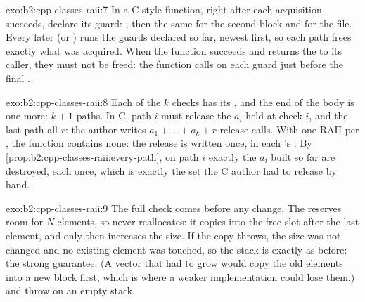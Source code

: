 \begin{solution}{exo:b2:cpp-classes-raii:7}
In a C-style function, right after each acquisition succeeds, declare its guard:
, then the same for the second
block and for the file. Every later  (or ) runs the guards declared so far, newest first, so
each path frees exactly what was acquired. When the function succeeds and returns the  to its caller, they
must not be freed: the function calls  on each guard just before the final .
\end{solution}

\begin{solution}{exo:b2:cpp-classes-raii:8}
Each of the $k$ checks has its , and the end of the body is one more: $k + 1$ paths. In C, path $i$ must
release the $a_i$  held at check $i$, and the last path all $r$: the author writes
$a_1 + \dots + a_k + r$ release calls. With one RAII  per , the function contains none: the release is
written once, in each 's . By \cref{prop:b2:cpp-classes-raii:every-path}, on path $i$ exactly the
$a_i$  built so far are destroyed, each once, which is exactly the set the C author had to release by hand.
\end{solution}

\begin{solution}{exo:b2:cpp-classes-raii:9}
The full check comes before any change. The  reserves room for $N$ elements, so  never
reallocates: it copies  into the free slot after the last element, and only then increases the size. If the
copy throws, the size was not changed and no existing element was touched, so the stack is exactly as before: the
strong guarantee. (A vector that had to grow would copy the old elements into a new block first, which is where a
weaker implementation could lose them.)  and  throw  on an empty stack.
\end{solution}

